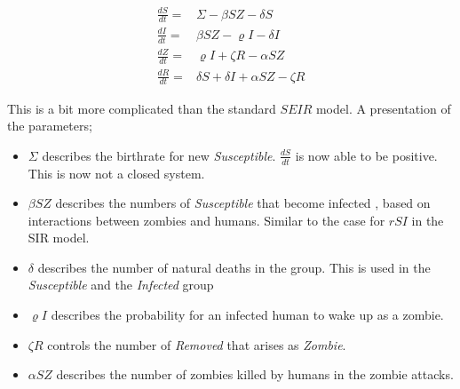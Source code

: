 \documentclass[%
twoside,                 %
final,                   %
chapterprefix=true,      %
open=right               %
10pt]{book}
\begin{document}
\begin{align*}
\frac{dS}{dt} =& \Sigma -\beta SZ - \delta S \\
\frac{dI}{dt} =& \beta SZ - \varrho I - \delta I\\
\frac{dZ}{dt} =& \varrho I + \zeta R - \alpha SZ\\
\frac{dR}{dt} =& \delta S + \delta I + \alpha SZ - \zeta R
\end{align*}

This is a bit more complicated than the standard $SEIR$ model. A presentation of the parameters;
\begin{itemize}
\item $\Sigma$ describes the birthrate for new \emph{Susceptible}. $\frac{dS}{dt}$ is now able to be positive. This is now not a closed system. 

\item $\beta SZ$ describes the numbers of \emph{Susceptible} that become infected , based on interactions between zombies and humans. Similar to the case for $rSI$ in the SIR model. 

\item $\delta$ describes the number of natural deaths in the group. This is used in the \emph{Susceptible} and the \emph{Infected} group

\item $\varrho I$ describes the probability for an infected human to wake up as a zombie.

\item $\zeta R$ controls the number of \emph{Removed} that arises as \emph{Zombie}. 

\item $\alpha SZ$ describes the number of zombies killed by humans in the zombie attacks. 
\end{itemize}

\noindent


\vspace{3mm}




\vspace{3mm}
\end{document}
